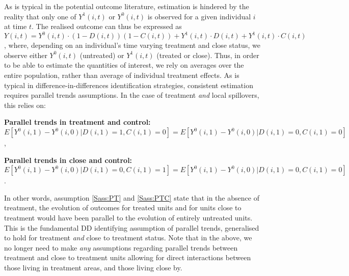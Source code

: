As is typical in the potential outcome literature, estimation is hindered by the
reality that only one of $Y^1(i,t)$ or $Y^0(i,t)$ is observed for a given 
individual $i$ at time $t$.  The realised outcome can thus be expressed as 
$Y(i,t)=Y^0(i,t)\cdot (1-D(i,t))(1-C(i,t))+Y^1(i,t)\cdot D(i,t)+Y^1(i,t)\cdot 
C(i,t)$, where, depending on an individual's time varying treatment and close
status, we observe either $Y^0(i,t)$ (untreated) or $Y^1(i,t)$ (treated or 
close).  Thus, in order to be able to estimate the quantities of interest, we 
rely on averages over the entire population, rather than average of individual 
treatment effects.  As is typical in difference-in-differences identification
strategies, consistent estimation requires parallel trends assumptions.  In the 
case of treatment \emph{and} local spillovers, this relies on:

\begin{assumption}{1}{}
\label{Sass:PT}
\textbf{Parallel trends in treatment and control:} \\
$E[Y^0(i,1)-Y^0(i,0)|D(i,1)=1,C(i,1)=0]=
E[Y^0(i,1)-Y^0(i,0)|D(i,1)=0,C(i,1)=0]$,
\end{assumption}
\begin{assumption}{2}{}
\label{Sass:PTC}
\textbf{Parallel trends in close and control:} \\
$E[Y^0(i,1)-Y^0(i,0)|D(i,1)=0,C(i,1)=1]=
E[Y^0(i,1)-Y^0(i,0)|D(i,1)=0,C(i,1)=0]$.
\end{assumption}

In other words, assumption \ref{Sass:PT} and \ref{Sass:PTC} state that in the 
absence of treatment, the evolution of outcomes for treated units and for units 
close to treatment would have been parallel to the evolution of entirely 
untreated units.  This is the fundamental DD identifying assumption of parallel 
trends, generalised to hold for treatment \emph{and} close to treatment status.  
Note that in the above, we no longer need to make \emph{any} assumptions 
regarding parallel trends between treatment and close to treatment units 
allowing for direct interactions between those living in treatment areas, and
those living close by.

